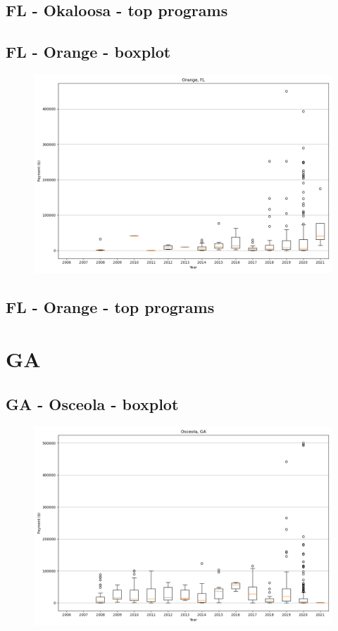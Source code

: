 \subsection*{FL - Okaloosa - top programs}

\newpage
\subsection*{FL - Orange - boxplot}
\begin{figure}[h]
\centering
\includegraphics[width=7in]{../output/boxplots/counties/Orange-FL_boxplot.png}
\end{figure}


\subsection*{FL - Orange - top programs}

\newpage
\section*{GA}
\subsection*{GA - Osceola - boxplot}
\begin{figure}[h]
\centering
\includegraphics[width=7in]{../output/boxplots/counties/Osceola-GA_boxplot.png}
\end{figure}


